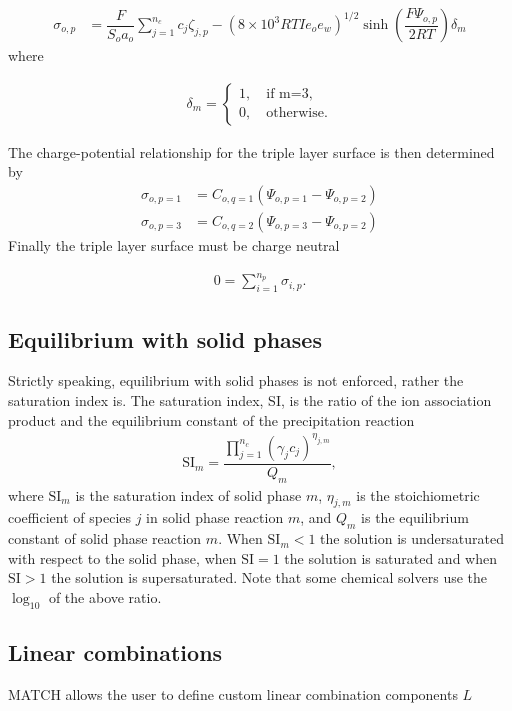 \documentclass{article}
\begin{document}
\begin{align}
\sigma_{o,p} &= \dfrac{F}{S_o a_o}\sum_{j=1}^{n_c}c_j\zeta_{j,p} - (8\times10^3 R T I e_o e_w)^{1/2}\sinh\left(\dfrac{F\Psi_{o,p}}{2RT}\right)\delta_m\label{eq:charge}
\end{align}
where 

\begin{align}
\delta_m = \begin{cases}
1, \quad\text{if m=3},\\
0, \quad\text{otherwise}.
\end{cases}
\end{align}

The charge-potential relationship for the triple layer surface is then determined by
\begin{align}
\sigma_{o,p=1}  &= C_{o,q=1}\left(\Psi_{o,p=1} -\Psi_{o,p=2}\right)\label{eq:pot1}\\
\sigma_{o,p=3}  &= C_{o,q=2}\left(\Psi_{o,p=3} -\Psi_{o,p=2}\right)\label{eq:pot2}
\end{align}
Finally the triple layer surface must be charge neutral

\begin{align}
    0 = \sum_{i=1}^{n_p} \sigma_{i,p}.\label{eq:neutral}
\end{align}

\subsection{Equilibrium with solid phases}

Strictly speaking, equilibrium with solid phases is not enforced, rather the saturation index is. The saturation index, SI, is the ratio of the ion association product and the equilibrium constant of the precipitation reaction
\begin{align}
\text{SI}_m = \dfrac{\prod_{j=1}^{n_c} \left(\gamma_j c_j\right)^{\eta_{j,m}}}{Q_m},
\end{align}
where $\text{SI}_m$ is the saturation index of solid phase $m$, $\eta_{j,m}$ is the stoichiometric coefficient of species $j$ in solid phase reaction $m$, and $Q_m$ is the equilibrium constant of solid phase reaction $m$. When $\text{SI}_m<1$ the solution is undersaturated with respect to the solid phase, when $\text{SI}=1$ the solution is saturated and when $\text{SI}>1$ the solution is supersaturated. Note that some chemical solvers use the $\log_{10}$ of the above ratio. 

\subsection{Linear combinations}
MATCH allows the user to define custom linear combination components $L$
\end{document}
